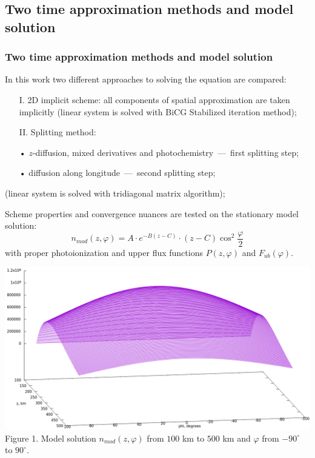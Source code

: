 \documentclass[9pt, apectratio=43,unicode]{beamer}
\begin{document}
\subsection{Two time approximation methods and model solution}
\begin{frame}\frametitle{Two time approximation methods and model solution}

In this work two different approaches to solving the equation are compared:

\begin{itemize}

\item[I.] 2D implicit scheme: all components of spatial approximation are taken implicitly (linear system is solved with BiCG Stabilized iteration method);

\item[II.] Splitting method: 

\end{itemize}

\begin{itemize}

\item[•] $z$-diffusion, mixed derivatives and photochemistry~---~first splitting step; 

\item[•] diffusion along longitude~---~second splitting step;

\end{itemize} 

(linear system is solved with tridiagonal matrix algorithm);

\bigskip 

\parbox[b][5cm][t]{50mm}{
Scheme properties and convergence nuances are tested on the stationary model solution: $$n_{mod}(z, \varphi) = A\cdot e^{-B(z-C)}\cdot(z-C)\cos^2\dfrac{\varphi}{2}$$ with proper photoionization and upper flux functions $P(z, \varphi)$ and $F_{ub}(\varphi)$.}
\hfill
\parbox[b][5cm][t]{60mm}{
\includegraphics[scale = 0.13]{model}\\Figure 1. Model solution $n_{mod}(z, \varphi)$ from
$100$ km to $500$ km and $\varphi$ from $-90^\circ$ to $90^\circ$.
}
\end{frame}
\end{document}
